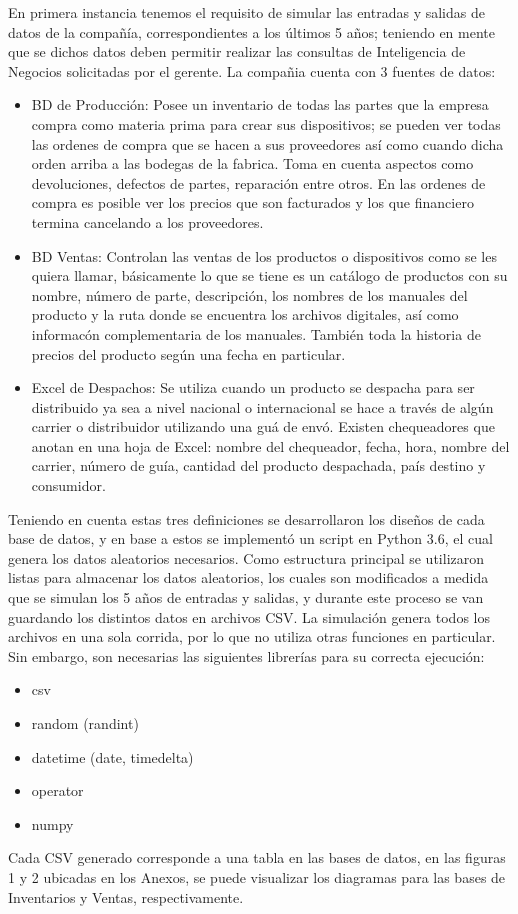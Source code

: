 \documentclass{article}
\begin{document}
En primera instancia tenemos el requisito de simular las entradas y salidas de datos de la compa\~n\'ia, correspondientes a los \'ultimos 5 a\~nos; teniendo en mente que se dichos datos deben permitir realizar las consultas de Inteligencia de Negocios solicitadas por el gerente. La compa\~nia cuenta con 3 fuentes de datos:
\begin{itemize}
\item BD de Producci\'on: Posee un inventario de todas las partes que la empresa compra como materia prima para crear sus dispositivos; se pueden ver todas las ordenes de compra que se hacen a sus proveedores as\'i como cuando dicha orden arriba a las bodegas de la fabrica. Toma en cuenta aspectos como devoluciones, defectos de partes, reparaci\'on entre otros. En las ordenes de compra es posible ver los precios que son facturados y los que financiero termina cancelando a los proveedores.
\item BD Ventas: Controlan las ventas de los productos o dispositivos como se les quiera llamar, b\'asicamente lo que se tiene es un cat\'alogo de productos con su nombre, n\'umero de parte, descripci\'on, los nombres de los manuales del producto y la ruta donde se encuentra los archivos digitales, as\'i como informac\'on complementaria de los manuales. Tambi\'en toda la historia de precios del producto seg\'un una fecha en particular.
\item Excel de Despachos: Se utiliza cuando un producto se despacha para ser distribuido ya sea a nivel nacional o internacional se hace a trav\'es de alg\'un carrier o distribuidor utilizando
una gu\'a de env\'o. Existen chequeadores que anotan en una hoja de Excel: nombre del chequeador, fecha, hora, nombre del carrier, n\'umero de gu\'ia, cantidad del producto despachada, pa\'is destino y consumidor.
\end{itemize}

Teniendo en cuenta estas tres definiciones se desarrollaron los dise\~nos de cada base de datos, y en base a estos se implement\'o un script en Python 3.6, el cual genera los datos aleatorios necesarios. Como estructura principal se utilizaron listas para almacenar los datos aleatorios, los cuales son modificados a medida que se simulan los 5 a\~nos de entradas y salidas, y durante este proceso se van guardando los distintos datos en archivos CSV. La simulaci\'on genera todos los archivos en una sola corrida, por lo que no utiliza otras funciones en particular. Sin embargo, son necesarias las siguientes librer\'ias para su correcta ejecuci\'on:
\begin{itemize}
  \item csv
  \item random (randint)
  \item datetime (date, timedelta)
  \item operator
  \item numpy
\end{itemize}
Cada CSV generado corresponde a una tabla en las bases de datos, en las figuras 1 y 2 ubicadas en los Anexos, se puede visualizar los diagramas para las bases de Inventarios y Ventas, respectivamente.
\end{document}
